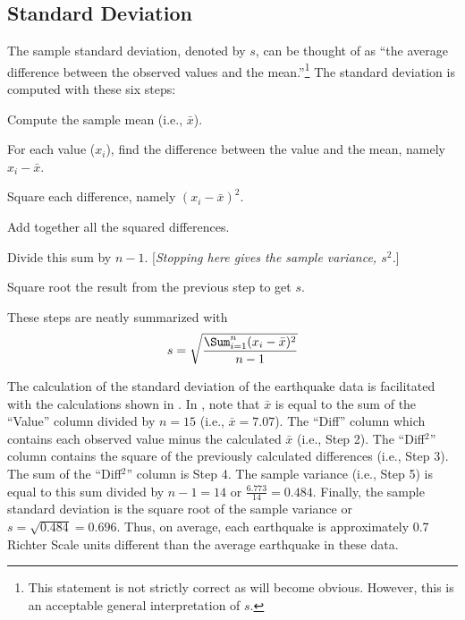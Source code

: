 \documentclass[10pt,openany]{book}\usepackage[]{graphicx}\usepackage[]{color}
\begin{document}
\subsection{Standard Deviation}\label{sect:StdDev}
The sample standard deviation, denoted by $s$, can be thought of as ``the average difference between the observed values and the mean.''\footnote{This statement is not strictly correct as will become obvious.  However, this is an acceptable general interpretation of $s$.}  The standard deviation is computed with these six steps:
\begin{Enumerate}
  \item Compute the sample mean (i.e., $\bar{x}$).
  \item For each value ($x_{i}$), find the difference between the value and the mean, namely $x_{i}-\bar{x}$.
  \item Square each difference, namely $(x_{i}-\bar{x})^{2}$.
  \item Add together all the squared differences.
  \item Divide this sum by $n-1$.  [\textit{Stopping here gives the sample variance, $s^{2}$.}]
  \item Square root the result from the previous step to get $s$.
\end{Enumerate}
These steps are neatly summarized with
\begin{equation}
  \label{eqn:SampleSD}
     s = \sqrt{\frac{\Sum_{i=1}^{n}(x_{i}-\bar{x})^{2}}{n-1}}
\end{equation}

The calculation of the standard deviation of the earthquake data  is facilitated with the calculations shown in .  In , note that $\bar{x}$ is equal to the sum of the ``Value'' column divided by $n=15$ (i.e., $\bar{x}=7.07$).  The ``Diff'' column which contains each observed value minus the calculated $\bar{x}$ (i.e., Step 2).  The ``Diff$^2$'' column contains the square of the previously calculated differences (i.e., Step 3).  The sum of the ``Diff$^2$'' column is Step 4.  The sample variance (i.e., Step 5) is equal to this sum divided by $n-1=14$ or $\frac{6.773}{14}=0.484$.  Finally, the sample standard deviation is the square root of the sample variance or $s=\sqrt{0.484}=0.696$.  Thus, on average, each earthquake is approximately 0.7 Richter Scale units different than the average earthquake in these data.
\end{document}
